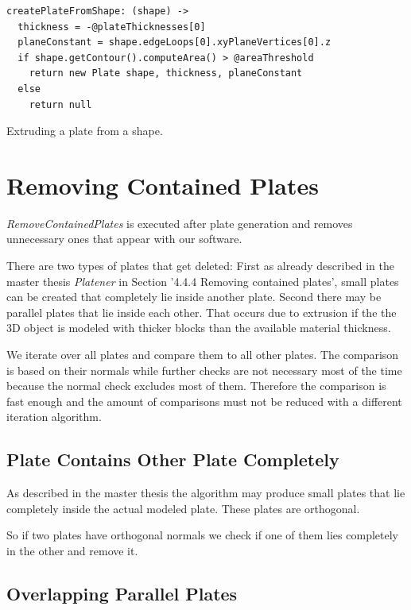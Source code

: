 \documentclass[../ClassicThesis.tex]{subfiles}
\begin{document}
\begin{listing}
\begin{verbatim}
createPlateFromShape: (shape) ->
  thickness = -@plateThicknesses[0]
  planeConstant = shape.edgeLoops[0].xyPlaneVertices[0].z
  if shape.getContour().computeArea() > @areaThreshold
    return new Plate shape, thickness, planeConstant
  else
    return null
\end{verbatim}
\caption{Extruding a plate from a shape.}
\label{lst:extrude}
\end{listing}

\section{Removing Contained Plates}\label{sec:removingContainedPlates}

\emph{RemoveContainedPlates} is executed after plate generation and removes unnecessary ones that appear with our software.

There are two types of plates that get deleted: First as already described in the master thesis \emph{Platener} \cite{master-thesis} in Section '4.4.4 Removing contained plates', small plates can be created that completely lie inside another plate. Second there may be parallel plates that lie inside each other. That occurs due to extrusion if the the 3D object is modeled with thicker blocks than the available material thickness.

We iterate over all plates and compare them to all other plates. The comparison is based on their normals while further checks are not necessary most of the time because the normal check excludes most of them. Therefore the comparison is fast enough and the amount of comparisons must not be reduced with a different iteration algorithm.

\subsection{Plate Contains Other Plate Completely}

As described in the master thesis the algorithm may produce small plates that lie completely inside the actual modeled plate. These plates are orthogonal.

So if two plates have orthogonal normals we check if one of them lies completely in the other and remove it.


\subsection{Overlapping Parallel Plates}
\end{document}
